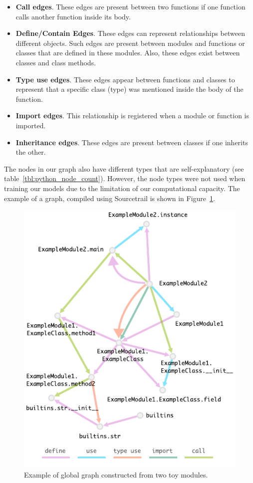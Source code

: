 \documentclass[a4paper,twoside]{article}
\begin{document}
\begin{itemize}
    \item \textbf{Call edges}. These edges are present between two functions if one function calls another function inside its body.
    \item \textbf{Define/Contain Edges}. These edges can represent relationships between different objects. Such edges are present between modules and functions or classes that are defined in these modules. Also, these edges exist between classes and class methods.
    \item \textbf{Type use edges}. These edges appear between functions and classes to represent that a specific class (type) was mentioned inside the body of the function.
    \item \textbf{Import edges}. This relationship is registered when a module or function is imported.
    \item \textbf{Inheritance edges}. These edges are present between classes if one inherits the other. 
\end{itemize}

The nodes in our graph also have different types that are self-explanatory (see table~\ref{tbl:python_node_count}). However, the node types were not used when training our models due to the limitation of our computational capacity. The example of a graph, compiled using Sourcetrail is shown in Figure~\ref{fig:python_graph}.

\begin{figure}
    \centering
    \includegraphics{python_graph_example.pdf}
    \caption{Example of global graph constructed from two toy modules.}\label{fig:python_graph}
\end{figure}
\end{document}
